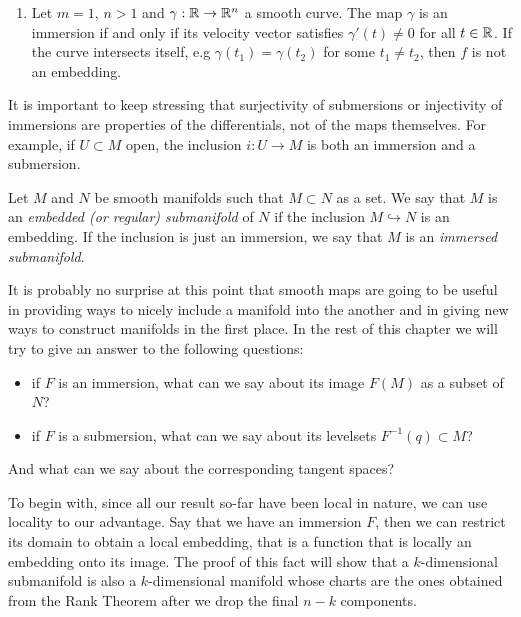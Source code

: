 \begin{example}
\begin{enumerate}
		\item Let $m=1$, $n > 1$ and $\gamma:\mathbb{R}\to\mathbb{R}^n$ a smooth curve.
		      The map $\gamma$ is an immersion if and only if its velocity vector satisfies $\gamma'(t)\neq0$ for all $t\in\mathbb{R}$.
		      If the curve intersects itself, e.g $\gamma(t_1) = \gamma(t_2)$ for some $t_1\neq t_2$, then $f$ is not an embedding.
	\end{enumerate}
\end{example}

\begin{remark}
	It is important to keep stressing that surjectivity of submersions or injectivity of immersions are properties of the differentials, not of the maps themselves.
	For example, if $U\subset M$ open, the inclusion $i: U \to M$ is both an immersion and a submersion.
\end{remark}

\begin{definition}
	Let $M$ and $N$ be smooth manifolds such that $M\subset N$ as a set.
	We say that $M$ is an \emph{embedded (or regular) submanifold} of $N$ if the inclusion $M\hookrightarrow N$ is an embedding. If the inclusion is just an immersion, we say that $M$ is an \emph{immersed submanifold}.
\end{definition}

It is probably no surprise at this point that smooth maps are going to be useful in providing ways to nicely include a manifold into the another and in giving new ways to construct manifolds in the first place.
In the rest of this chapter we will try to give an answer to the following questions:
\begin{itemize}
	\item if $F$ is an immersion, what can we say about its image $F(M)$ as a subset of $N$?
	\item if $F$ is a submersion, what can we say about its levelsets $F^{-1}(q) \subset M$?
\end{itemize}
And what can we say about the corresponding tangent spaces?


To begin with, since all our result so-far have been local in nature, we can use locality to our advantage.
Say that we have an immersion $F$, then we can restrict its domain to obtain a local embedding, that is
a function that is locally an embedding onto its image.
The proof of this fact will show that a $k$-dimensional submanifold is also a $k$-dimensional manifold
whose charts are the ones obtained from the Rank Theorem after we drop the final $n-k$ components.

